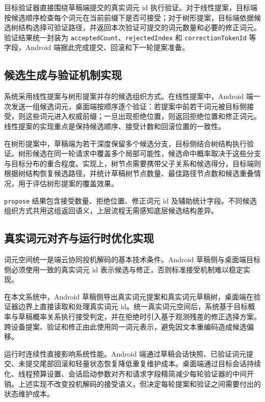 目标验证器直接围绕草稿端提交的真实词元 id 执行验证。对于线性提案，目标端按候选顺序检查每个词元在当前前缀下是否可接受；对于树形提案，目标端依据候选树结构选择可验证路径，并返回本次验证可提交的词元数量和必要的修正词元。验证结果统一封装为 \texttt{acceptedCount}、\texttt{rejectedIndex} 和 \texttt{correctionTokenId} 等字段，Android 端据此完成提交、回滚和下一轮提案准备。

\subsection{候选生成与验证机制实现}

系统采用线性提案与树形提案并存的候选组织方式。在线性提案中，Android 端一次发送一组候选词元，桌面端按顺序逐个验证：若提案中前若干词元被目标侧接受，则这些词元进入权威前缀；一旦出现拒绝位置，则返回拒绝位置和修正词元。线性提案的实现重点是保持候选顺序、接受计数和回滚位置的一致性。

在树形提案中，草稿端为若干深度保留多个候选分支，目标侧结合树结构执行验证。树形候选在同一轮请求中覆盖多个局部可能性，候选命中概率取决于这些分支与目标分布的重合程度。实现上，树节点需要携带父子关系和候选得分，目标端则根据树结构恢复候选路径，并统计草稿树节点数量、最佳路径节点数和候选重叠情况，用于评估树形提案的覆盖效果。

\texttt{propose} 结果包含接受数量、拒绝位置、修正词元 id 及辅助统计字段。不同候选组织方式共用这组返回语义，上层流程无需感知底层候选结构差异。

\subsection{真实词元对齐与运行时优化实现}

词元空间统一是端云协同投机解码的基本技术条件。Android 草稿侧与桌面端目标侧必须使用一致的真实词元 id 表示候选与修正，否则标准接受机制难以稳定实现\cite{li2024eagle}。

在本文系统中，Android 草稿侧导出真实词元提案和真实词元草稿树，桌面端在验证器边界上直接读取和处理真实词元 id。统一真实词元空间后，系统基于目标概率与草稿概率关系执行接受判定，并在拒绝时引入基于观测残差的修正选择方案。跨设备提案、验证和修正由此使用同一词元表示，避免因文本重编码造成候选偏移。

运行时连续性直接影响系统性能。Android 端通过草稿会话快照、已验证词元提交、未提交尾部回滚和轻量状态恢复降低重复维护成本。桌面端通过目标会话持续化、线程预算设置、会话启动参数对齐和请求字段精简减少每轮验证器的中间开销。上述实现不改变投机解码的接受语义，但决定每轮提案和验证之间需要付出的状态维护成本。
